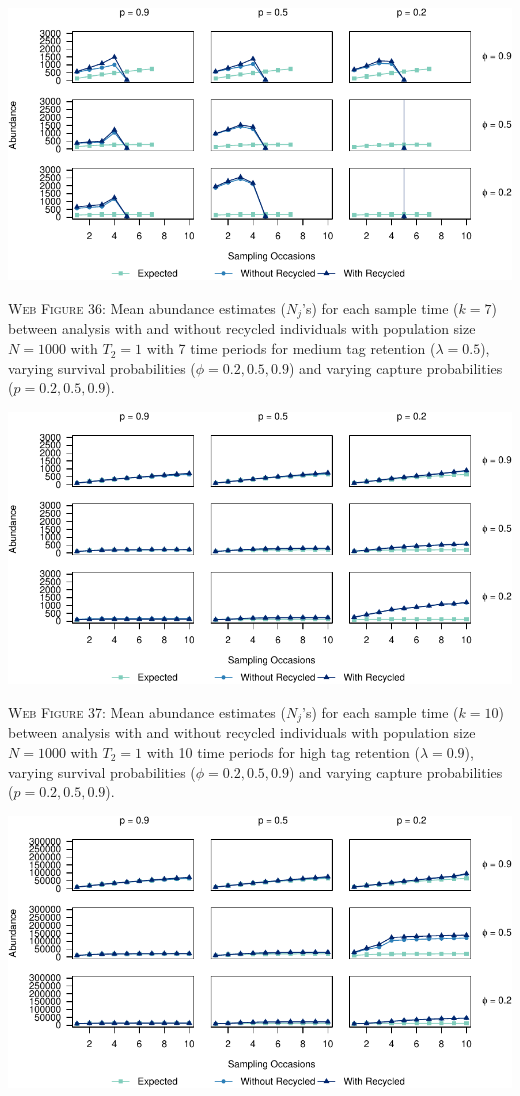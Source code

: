 \documentclass[]{article}
\begin{document}
\includegraphics{Appendix_files/figure-latex/36_abundance_M_GJSTL6-1.pdf}

\textsc{Web Figure 36:} Mean abundance estimates (\(N_j\)'s) for each
sample time (\(k=7\)) between analysis with and without recycled
individuals with population size \(N=1000\) with \(T_2=1\) with 7 time
periods for medium tag retention (\(\lambda=0.5\)), varying survival
probabilities (\(\phi=0.2,0.5,0.9\)) and varying capture probabilities
(\(p=0.2,0.5,0.9\)).

\newpage

\includegraphics{Appendix_files/figure-latex/37_abundance_H_GJSTL1-1.pdf}

\textsc{Web Figure 37:} Mean abundance estimates (\(N_j\)'s) for each
sample time (\(k=10\)) between analysis with and without recycled
individuals with population size \(N=1000\) with \(T_2=1\) with 10 time
periods for high tag retention (\(\lambda=0.9\)), varying survival
probabilities (\(\phi=0.2,0.5,0.9\)) and varying capture probabilities
(\(p=0.2,0.5,0.9\)).

\includegraphics{Appendix_files/figure-latex/38_abundance_H_GJSTL2-1.pdf}
\end{document}
